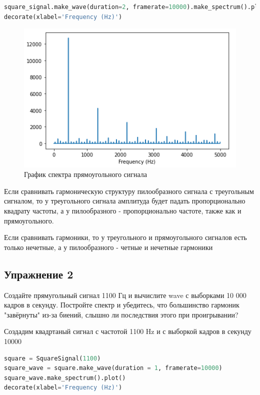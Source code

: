 \begin{lstlisting}[language=Python]
square_signal.make_wave(duration=2, framerate=10000).make_spectrum().plot()
decorate(xlabel='Frequency (Hz)')
\end{lstlisting}

\begin{figure}[H]
	\begin{center}
		\includegraphics[scale=1]{fig/lab02/lab02_06.png}
		\caption{График спектра прямоугольного сигнала}
	\end{center}
\end{figure}

Если сравнивать гармоническую структуру пилообразного сигнала с треугольным сигналом, то у треугольного сигнала амплитуда будет падать пропорционально квадрату частоты, а у пилообразного - пропорционально частоте, также как и прямоугольного.

Если сравнивать гармоники, то у треугольного и прямоугольного сигналов есть только нечетные, а у пилообразного - четные и нечетные гармоники


\subsection{Упражнение 2}

Создайте прямугольный сигнал 1100 Гц и вычислите wave с выборками 10 000 кадров в секунду. Постройте спектр и убедитесь, что большинство гармоник "завёрнуты" из-за биений, слышно ли последствия этого при проигрывании?

Создадим квадртаный сигнал с частотой 1100 Hz и с выборкой кадров в секунду 10000

\begin{lstlisting}[language=Python]
square = SquareSignal(1100)
square_wave = square.make_wave(duration = 1, framerate=10000)
square_wave.make_spectrum().plot()
decorate(xlabel='Frequency (Hz)')
\end{lstlisting}

